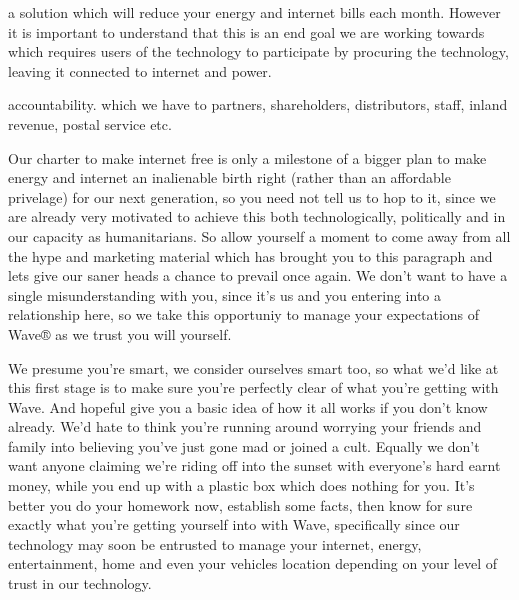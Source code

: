 \documentclass[letterpaper,10pt,openany,oneside,english]{sphinxmanual}
\begin{document}
 a solution which will reduce your energy and internet bills each month. However it is important to understand that this is an end goal we are working towards which requires users of the technology to participate by procuring the technology, leaving it connected to internet and power.


 accountability. which we have to partners, shareholders, distributors, staff, inland revenue, postal service etc.



Our charter to make internet free is only a milestone of a bigger plan to make energy and internet an inalienable birth right (rather than an affordable privelage) for our next generation, so you need not tell us to hop to it, since we are already very motivated to achieve this both technologically, politically and in our capacity as humanitarians. So allow yourself a moment to come away from all the hype and marketing material which has brought you to this paragraph and lets give our saner heads a chance to prevail once again. We don’t want to have a single misunderstanding with you, since it’s us and you entering into a relationship here, so we take this opportuniy to manage your expectations of Wave® as we trust you will yourself.

We presume you’re smart, we consider ourselves smart too, so what we’d like at this first stage is to make sure you’re perfectly clear of what you’re getting with Wave. And hopeful give you a basic idea of how it all works if you don’t know already. We’d hate to think you’re running around worrying your friends and family into believing you’ve just gone mad or joined a cult. Equally we don’t want anyone claiming we’re riding off into the sunset with everyone’s hard earnt money, while you end up with a plastic box which does nothing for you. It’s better you do your homework now, establish some facts, then know for sure exactly what you’re getting yourself into with Wave, specifically since our technology may soon be entrusted to manage your internet, energy, entertainment, home and even your vehicles location depending on your level of trust in our technology.
\end{document}
